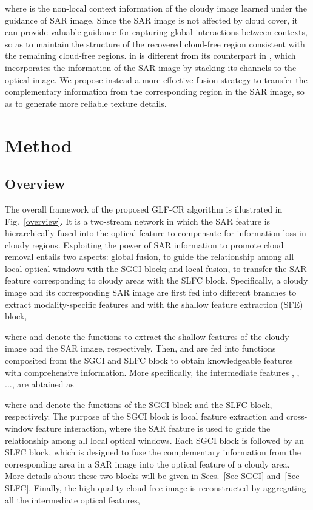 \documentclass[a4paper,fleqn]{cas-dc}
\begin{document}
where  is the non-local context information of the cloudy image learned under the guidance of SAR image. Since the SAR image is not affected by cloud cover, it can provide valuable guidance for capturing global interactions between contexts, so as to maintain the structure of the recovered cloud-free region consistent with the remaining cloud-free regions.  in  is different from its counterpart in , which incorporates the information of the SAR image by stacking its channels to the optical image. We propose instead a more effective fusion strategy to transfer the complementary information from the corresponding region in the SAR image, so as to generate more reliable texture details.



\section{Method}
\subsection{Overview}
The overall framework of the proposed GLF-CR algorithm is illustrated in Fig.~\ref{overview}. It is a two-stream network in which the SAR feature is hierarchically fused into the optical feature to compensate for information loss in cloudy regions.  Exploiting the power of SAR information to promote cloud removal entails two aspects: global fusion, to guide the relationship among all local optical windows with the SGCI block; and local fusion, to transfer the SAR feature corresponding to cloudy areas with the SLFC block. Specifically, 
a cloudy image  and its corresponding SAR image  are first fed into different branches to extract modality-specific features  and  with the shallow feature extraction (SFE) block, 

where  and  denote the functions to extract the shallow features of the cloudy image and the SAR image, respectively.
Then, 
 and  are fed into  functions composited from the SGCI and SLFC block to obtain knowledgeable features with comprehensive information. 
More specifically, 
the intermediate features ,  , ...,  are abtained as

where  and  denote the functions of the SGCI block and the SLFC block, respectively.
The purpose of the SGCI block is local feature extraction and cross-window feature interaction, where the SAR feature is used to guide the relationship among all local optical windows. Each SGCI block is followed by an SLFC block, which is designed to fuse the complementary information from the corresponding area in a SAR image into the optical feature of a cloudy area. More details about these two blocks will be given in Secs.~\ref{Sec-SGCI} and~\ref{Sec-SLFC}.
Finally, 
the high-quality cloud-free image  is reconstructed by aggregating all the intermediate optical features,
\end{document}
